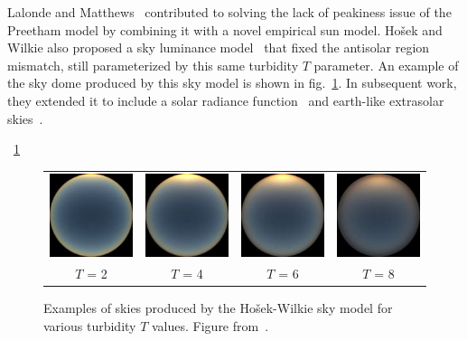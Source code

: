 Lalonde and Matthews~\cite{lalonde-3dv-14} contributed to solving the lack of peakiness issue of the Preetham model by combining it with a novel empirical sun model. Ho\v{s}ek and Wilkie also proposed a sky luminance model~\cite{hosek-siggraph-12} that fixed the antisolar region mismatch, still parameterized by this same turbidity $T$ parameter. An example of the sky dome produced by this sky model is shown in fig.~\ref{fig:hw_sky_model}. In subsequent work, they extended it to include a solar radiance function~\cite{hosek-cga-13} and earth-like extrasolar skies~\cite{wilkie2013predicting}.

~\ref{fig:hw_sky_model}

\begin{figure}
\centering
\begin{tabular}{@{}c@{}c@{}c@{}c@{}}
\includegraphics[width=0.23\linewidth]{3rdparty/hw-004.jpg} &
\includegraphics[width=0.23\linewidth]{3rdparty/hw-005.jpg} &
\includegraphics[width=0.23\linewidth]{3rdparty/hw-006.jpg} &
\includegraphics[width=0.23\linewidth]{3rdparty/hw-007.jpg} \\
$T$ = 2 & $T$ = 4 & $T$ = 6 & $T$ = 8 \\
\end{tabular}
\caption[Examples of skies produced by the Ho\v{s}ek-Wilkie sky model]{Examples of skies produced by the Ho\v{s}ek-Wilkie sky model for various turbidity $T$ values. Figure from~\cite{hosek-siggraph-12}.}
\label{fig:hw_sky_model}
\end{figure}

